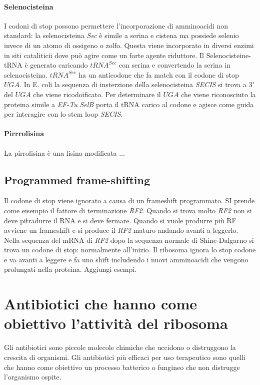 \paragraph{Selenocisteina}
I codoni di stop possono permettere l'incorporazione di amminoacidi non standard: la selenocisteina \emph{Sec} \`e simile a serina e cistena ma possiede selenio invece di un atomo
di ossigeno o zolfo. Questa viene incorporato in diversi enzimi in siti cataliticii dove pu\`o agire come un forte agente riduttore. Il Selenocisteine-tRNA \`e generato caricando 
\emph{$tRNA^{Sec}$} con serina e convertendo la serina in selenocisteina. \emph{$tRNA^{Sec}$} ha un anticodone che fa match con il codone di stop $UGA$. In E. coli la sequenza di 
insterzione della selenocisteina \emph{SECIS} si trova a $3'$ del $UGA$ che viene ricodoificato. Per determinare il $UGA$ che viene riconosciuto la proteina simile a \emph{EF-Tu} 
\emph{SelB} porta il tRNA carico al codone e agisce come guida per interagire con lo stem loop \emph{SECIS}. 
\paragraph{Pirrrolisina}
La pirrolisina \`e una lisina modificata ...
\subsection{Programmed frame-shifting}
Il codone di stop viene ignorato a causa di un frameshift programmato. SI prende come eisempio il fattore di terminazione \emph{RF2}. Quando si trova molto \emph{RF2} non si deve pi\`
tradurre il RNA e si deve fermare. Quando si vuole produrre pi\`u RF avviene un frameshift e si produce il \emph{RF2} maturo andando avanti a leggerlo. Nella sequenza del mRNA di 
\emph{RF2} dopo la sequenza normale di Shine-Dalgarno si trova un codone di stop: normalmente all'inizio. Il ribosoma ignora lo stop codone e va avanti a leggere e fa uno shift 
includendo i nuovi amminoacidi che vengono prolungati nella proteina. Aggiungi esempi.


\section{Antibiotici che hanno come obiettivo l'attivit\`a del ribosoma}
Gli antibiotici sono piccole molecole chimiche che uccidono o distruggono la crescita di organismi. Gli antibiotici pi\`u efficaci per uso terapeutico sono quelli che hanno
come obiettivo un processo batterico o fungineo che non distrugge l'organismo ospite. 

